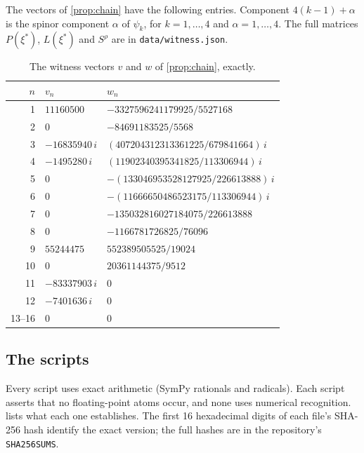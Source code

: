 \documentclass[11pt]{article}
\theoremstyle{plain}
\theoremstyle{definition}
\theoremstyle{remark}
\begin{document}
The vectors of \cref{prop:chain} have the following entries. Component $4(k-1)+\alpha$ is the spinor component $\alpha$ of $\psi_k$, for $k = 1,\dots,4$ and $\alpha = 1,\dots,4$. The full matrices $P(\xi^*)$, $L(\xi^*)$ and $S^\rho$ are in \texttt{data/witness.json}.

{\small
\renewcommand{\arraystretch}{1.15}
\begin{longtable}{@{}r l l@{}}
\caption{The witness vectors $v$ and $w$ of \cref{prop:chain}, exactly.}\label{tab:vectors}\\
\toprule
$n$ & $v_n$ & $w_n$ \\
\midrule
1  & $11160500$          & $-3327596241179925/5527168$ \\
2  & $0$                 & $-84691183525/5568$ \\
3  & $-16835940\,i$      & $(407204312313361225/679841664)\,i$ \\
4  & $-1495280\,i$       & $(11902340395341825/113306944)\,i$ \\
5  & $0$                 & $-(133046953528127925/226613888)\,i$ \\
6  & $0$                 & $-(11666650486523175/113306944)\,i$ \\
7  & $0$                 & $-135032816027184075/226613888$ \\
8  & $0$                 & $-1166781726825/76096$ \\
9  & $55244475$          & $552389505525/19024$ \\
10 & $0$                 & $20361144375/9512$ \\
11 & $-83337903\,i$      & $0$ \\
12 & $-7401636\,i$       & $0$ \\
13--16 & $0$             & $0$ \\
\bottomrule
\end{longtable}
}

\subsection{The scripts}\label{app:scripts}

Every script uses exact arithmetic (SymPy rationals and radicals). Each script asserts that no floating-point atoms occur, and none uses numerical recognition.  lists what each one establishes. The first 16 hexadecimal digits of each file's SHA-256 hash identify the exact version; the full hashes are in the repository's \texttt{SHA256SUMS}.
\end{document}
